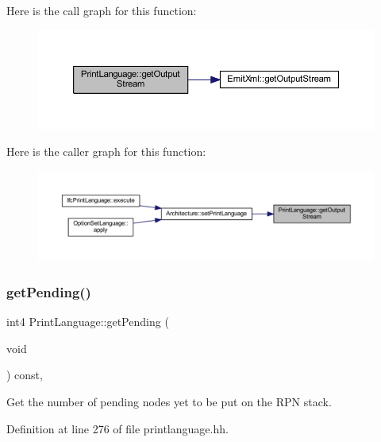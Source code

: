 Here is the call graph for this function\+:
\nopagebreak
\begin{figure}[H]
\begin{center}
\leavevmode
\includegraphics[width=350pt]{class_print_language_a6f3c67db2f14e4a8ef13697c28a0a429_cgraph}
\end{center}
\end{figure}
Here is the caller graph for this function\+:
\nopagebreak
\begin{figure}[H]
\begin{center}
\leavevmode
\includegraphics[width=350pt]{class_print_language_a6f3c67db2f14e4a8ef13697c28a0a429_icgraph}
\end{center}
\end{figure}
\mbox{\label{class_print_language_a6d711c4dfac0fbe001fa43bb1f0f71e2}} 
\subsubsection{\texorpdfstring{getPending()}{getPending()}}
{\footnotesize\ttfamily int4 Print\+Language\+::get\+Pending (\begin{DoxyParamCaption}\item[{void}]{ }\end{DoxyParamCaption}) const\hspace{0.3cm}{\ttfamily [inline]}, {\ttfamily [protected]}}



Get the number of pending nodes yet to be put on the R\+PN stack. 



Definition at line 276 of file printlanguage.\+hh.

